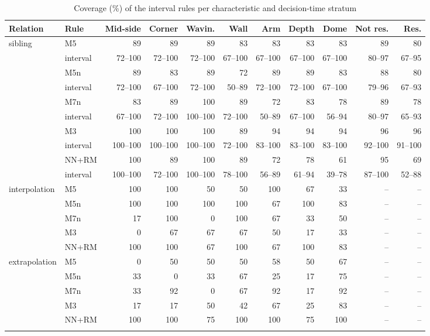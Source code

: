 \documentclass[pdflatex,sn-basic]{sn-jnl}
\newcommand{\tabsizesmall}{\footnotesize}
\begin{document}
\begin{table}[p]
\tabsizesmall
\setlength{\tabcolsep}{2pt}
\caption{Coverage (\%) of the interval rules per characteristic and decision-time stratum}\label{tab:s-coverage-qc}
\begin{tabular}{@{}llrrrrrrrrr@{}}
\toprule
Relation & Rule & Mid-side & Corner & Wavin. & Wall & Arm & Depth & Dome & Not res. & Res. \\
\midrule
sibling & M5 & 89 & 89 & 89 & 83 & 83 & 83 & 83 & 89 & 80 \\
 & \quad interval & 72--100 & 72--100 & 72--100 & 67--100 & 67--100 & 67--100 & 67--100 & 80--97 & 67--95 \\
 & M5n & 89 & 83 & 89 & 72 & 89 & 89 & 83 & 88 & 80 \\
 & \quad interval & 72--100 & 67--100 & 72--100 & 50--89 & 72--100 & 72--100 & 67--100 & 79--96 & 67--93 \\
 & M7n & 83 & 89 & 100 & 89 & 72 & 83 & 78 & 89 & 78 \\
 & \quad interval & 67--100 & 72--100 & 100--100 & 72--100 & 50--89 & 67--100 & 56--94 & 80--97 & 65--93 \\
 & M3 & 100 & 100 & 100 & 89 & 94 & 94 & 94 & 96 & 96 \\
 & \quad interval & 100--100 & 100--100 & 100--100 & 72--100 & 83--100 & 83--100 & 83--100 & 92--100 & 91--100 \\
 & NN+RM & 100 & 89 & 100 & 89 & 72 & 78 & 61 & 95 & 69 \\
 & \quad interval & 100--100 & 72--100 & 100--100 & 78--100 & 56--89 & 61--94 & 39--78 & 87--100 & 52--88 \\
interpolation & M5 & 100 & 100 & 50 & 50 & 100 & 67 & 33 & -- & -- \\
 & M5n & 100 & 100 & 100 & 100 & 67 & 100 & 83 & -- & -- \\
 & M7n & 17 & 100 & 0 & 100 & 67 & 33 & 50 & -- & -- \\
 & M3 & 0 & 67 & 67 & 67 & 50 & 17 & 33 & -- & -- \\
 & NN+RM & 100 & 100 & 67 & 100 & 67 & 100 & 83 & -- & -- \\
extrapolation & M5 & 0 & 50 & 50 & 50 & 58 & 50 & 67 & -- & -- \\
 & M5n & 33 & 0 & 33 & 67 & 25 & 17 & 75 & -- & -- \\
 & M7n & 33 & 92 & 0 & 67 & 92 & 17 & 92 & -- & -- \\
 & M3 & 17 & 17 & 50 & 42 & 67 & 25 & 83 & -- & -- \\
 & NN+RM & 100 & 100 & 75 & 100 & 100 & 75 & 100 & -- & -- \\
\botrule
\end{tabular}
\end{table}
\end{document}
